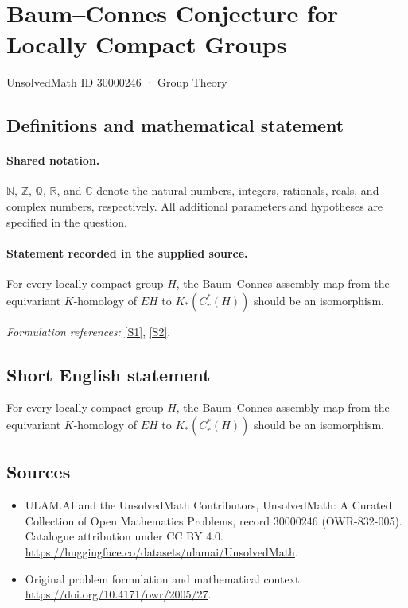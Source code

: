 \documentclass[11pt]{article}
\newcommand{\sref}[2]{\hyperlink{source:#1:#2}{[S#2]}}
\begin{document}
\setcounter{section}{30000245}
\section{Baum–Connes Conjecture for Locally Compact Groups}\label{30000246}
{\small UnsolvedMath ID 30000246 · Group Theory}
\subsection{Definitions and mathematical statement}

\paragraph{Shared notation.}$\mathbb N$, $\mathbb Z$, $\mathbb Q$, $\mathbb R$, and $\mathbb C$ denote the natural numbers, integers, rationals, reals, and complex numbers, respectively. All additional parameters and hypotheses are specified in the question.


\paragraph{Statement recorded in the supplied source.}
For every locally compact group $H$, the Baum–Connes assembly map from the equivariant $K$-homology of $EH$ to $K_*(C_r^*(H))$ should be an isomorphism.
\par\smallskip\textit{Formulation references:} \sref{30000246}{1}, \sref{30000246}{2}.
\subsection{Short English statement}
For every locally compact group $H$, the Baum–Connes assembly map from the equivariant $K$-homology of $EH$ to $K_*(C_r^*(H))$ should be an isomorphism.
\subsection{Sources}
\begin{itemize}
\item[\hypertarget{source:30000246:1}{S1}] ULAM.AI and the UnsolvedMath Contributors, UnsolvedMath: A Curated Collection of Open Mathematics Problems, record 30000246 (OWR-832-005). Catalogue attribution under CC BY 4.0.
\url{https://huggingface.co/datasets/ulamai/UnsolvedMath}.
\item[\hypertarget{source:30000246:2}{S2}] Original problem formulation and mathematical context.
\url{https://doi.org/10.4171/owr/2005/27}.
\end{itemize}
\label{end:30000246}
\end{document}
